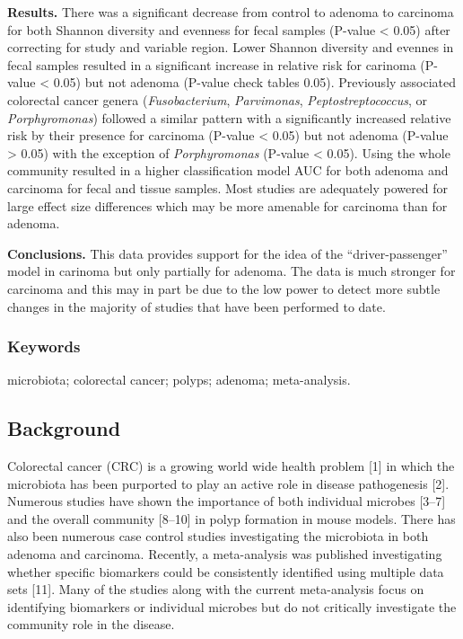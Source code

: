 \documentclass[12pt,]{article}
\begin{document}
\textbf{Results.} There was a significant decrease from control to
adenoma to carcinoma for both Shannon diversity and evenness for fecal
samples (P-value \textless{} 0.05) after correcting for study and
variable region. Lower Shannon diversity and evennes in fecal samples
resulted in a significant increase in relative risk for carinoma
(P-value \textless{} 0.05) but not adenoma (P-value check tables 0.05).
Previously associated colorectal cancer genera (\emph{Fusobacterium},
\emph{Parvimonas}, \emph{Peptostreptococcus}, or \emph{Porphyromonas})
followed a similar pattern with a significantly increased relative risk
by their presence for carcinoma (P-value \textless{} 0.05) but not
adenoma (P-value \textgreater{} 0.05) with the exception of
\emph{Porphyromonas} (P-value \textless{} 0.05). Using the whole
community resulted in a higher classification model AUC for both adenoma
and carcinoma for fecal and tissue samples. Most studies are adequately
powered for large effect size differences which may be more amenable for
carcinoma than for adenoma.

\textbf{Conclusions.} This data provides support for the idea of the
``driver-passenger'' model in carinoma but only partially for adenoma.
The data is much stronger for carcinoma and this may in part be due to
the low power to detect more subtle changes in the majority of studies
that have been performed to date.

\subsubsection{Keywords}\label{keywords}

microbiota; colorectal cancer; polyps; adenoma; meta-analysis.

\newpage

\subsection{Background}\label{background}

Colorectal cancer (CRC) is a growing world wide health problem {[}1{]}
in which the microbiota has been purported to play an active role in
disease pathogenesis {[}2{]}. Numerous studies have shown the importance
of both individual microbes {[}3--7{]} and the overall community
{[}8--10{]} in polyp formation in mouse models. There has also been
numerous case control studies investigating the microbiota in both
adenoma and carcinoma. Recently, a meta-analysis was published
investigating whether specific biomarkers could be consistently
identified using multiple data sets {[}11{]}. Many of the studies along
with the current meta-analysis focus on identifying biomarkers or
individual microbes but do not critically investigate the community role
in the disease.
\end{document}
